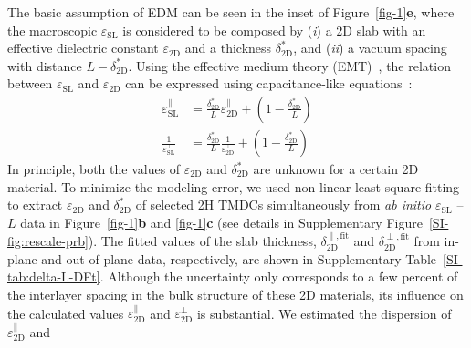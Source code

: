 \documentclass[journal=ancac3,manuscript=article,email=true,hyperref=true,keywords=false]{achemso}
\begin{document}
The basic assumption of EDM can be
seen in the inset of Figure~\ref{fig-1}\textbf{e}, where the macroscopic
$\varepsilon_{\mathrm{SL}}$ is considered to be composed by ({\it i}) a
2D slab with an effective dielectric constant $\varepsilon_{\mathrm{2D}}$
and a thickness $\delta^{*}_{\mathrm{2D}}$, and ({\it ii}) a vacuum spacing with
distance $L-\delta^{*}_{\mathrm{2D}}$. Using the effective medium theory
(EMT)~\cite{Aspnes_1982,Markel_2016}, the relation between  %
$\varepsilon_{\mathrm{SL}}$ and $\varepsilon_{\mathrm{2D}}$ can be
expressed using capacitance-like
equations~\cite{Matthes_2016,Laturia_2018,Tancogne_Dejean_2015}:
\begin{subequations}
  \begin{eqnarray}
    \label{Response:1}
    {\displaystyle \varepsilon_{\mathrm{SL}}^{\parallel}} &= {\displaystyle \frac{\delta^{*}_{\mathrm{2D}}}{L} \varepsilon_{\mathrm{2D}}^{\parallel} + \left(1 - \frac{\delta^{*}_{\mathrm{2D}}}{L} \right)}\\
     \label{eq:emt-2}
    {\displaystyle \frac{1}{\varepsilon_{\mathrm{SL}}^{\perp}}} &= {\displaystyle \frac{\delta^{*}_{\mathrm{2D}}}{L} \frac{1}{\varepsilon_{\mathrm{2D}}^{\perp}} + \left(1 - \frac{\delta^{*}_{\mathrm{2D}}}{L} \right)}
  \end{eqnarray}
\end{subequations}
In principle, both the values of $\varepsilon_{\mathrm{2D}}$ and
$\delta^{*}_{\mathrm{2D}}$ are unknown for a certain 2D material. To
minimize the modeling error, we used non-linear least-square fitting
to extract $\varepsilon_{\mathrm{2D}}$ and $\delta^{*}_{\mathrm{2D}}$ of
selected 2H TMDCs simultaneously from \textit{ab initio}
$\varepsilon_{\mathrm{SL}}$ -- $L$ data in
Figure~\ref{fig-1}\textbf{b} and \ref{fig-1}\textbf{c} (see details in 
Supplementary Figure~\ref{SI-fig:rescale-prb}). The fitted values of
the slab thickness, $\delta_{\mathrm{2D}}^{\parallel, \mathrm{fit}}$
and $\delta_{\mathrm{2D}}^{\perp, \mathrm{fit}}$ from in-plane and
out-of-plane data, respectively, are shown in Supplementary
Table~\ref{SI-tab:delta-L-DFt}.
%
%
Although the uncertainty only corresponds to a few percent of the
interlayer spacing in the bulk structure of these 2D materials, its
influence on the calculated values
$\varepsilon_{\mathrm{2D}}^{\parallel}$ and
$\varepsilon_{\mathrm{2D}}^{\perp}$ is substantial. 
We estimated the dispersion of $\varepsilon_{\mathrm{2D}}^{\parallel}$ and 
\end{document}
